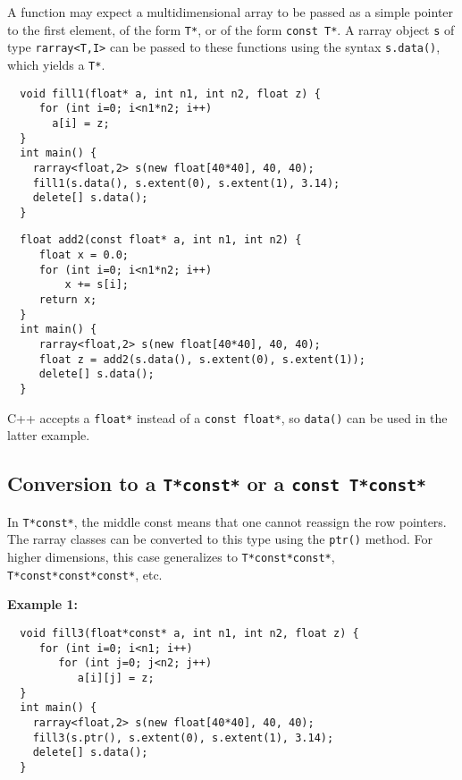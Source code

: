 \documentclass[12pt,twoside]{article}
\begin{document}
A function may expect a multidimensional array to be passed as a
simple pointer to the first element, of the form \texttt{T*}, or of the form  \texttt{const T*}. A rarray object
\texttt{s} of type \texttt{rarray{\tt<}T,I{\tt>}} can be passed to these
functions using the syntax \texttt{s.data()}, which yields a
\texttt{T*}.

\begin{framed}\vspace{-9pt}%
\begin{verbatim}
  void fill1(float* a, int n1, int n2, float z) {
     for (int i=0; i<n1*n2; i++)
       a[i] = z;
  }
  int main() {
    rarray<float,2> s(new float[40*40], 40, 40);
    fill1(s.data(), s.extent(0), s.extent(1), 3.14);
    delete[] s.data();
  }
\end{verbatim}
\end{framed}

\vspace{-5pt}\begin{framed}\vspace{-14pt}%
\begin{verbatim}
  float add2(const float* a, int n1, int n2) {
     float x = 0.0;
     for (int i=0; i<n1*n2; i++)
         x += s[i];
     return x;
  }
  int main() {
     rarray<float,2> s(new float[40*40], 40, 40);
     float z = add2(s.data(), s.extent(0), s.extent(1));
     delete[] s.data();
  }
\end{verbatim}
\vspace{-14pt}\end{framed}\vspace{-8pt}

\noindent
C++ accepts a \texttt{float*} instead of a \texttt{const float*}, so \texttt{data()} can be used in the latter example.

\subsection{Conversion to a {\tt T*const*} or a {\tt const T*const*} }

\noindent
In \texttt{T*const*}, the middle const means that one cannot reassign the row pointers.
The rarray classes can be converted to this type using the \texttt{ptr()} method. 
For higher dimensions, this case generalizes to \texttt{T*const*const*}, \texttt{T*const*const*const*}, etc.

\noindent
{\bf Example 1:}
\vspace{-5pt}\begin{framed}\vspace{-14pt}%
\begin{verbatim}
  void fill3(float*const* a, int n1, int n2, float z) {
     for (int i=0; i<n1; i++)
        for (int j=0; j<n2; j++)
           a[i][j] = z;
  }
  int main() {
    rarray<float,2> s(new float[40*40], 40, 40);
    fill3(s.ptr(), s.extent(0), s.extent(1), 3.14);
    delete[] s.data();
  }
\end{verbatim}
\vspace{-14pt}\end{framed}\vspace{-8pt}
\end{document}
